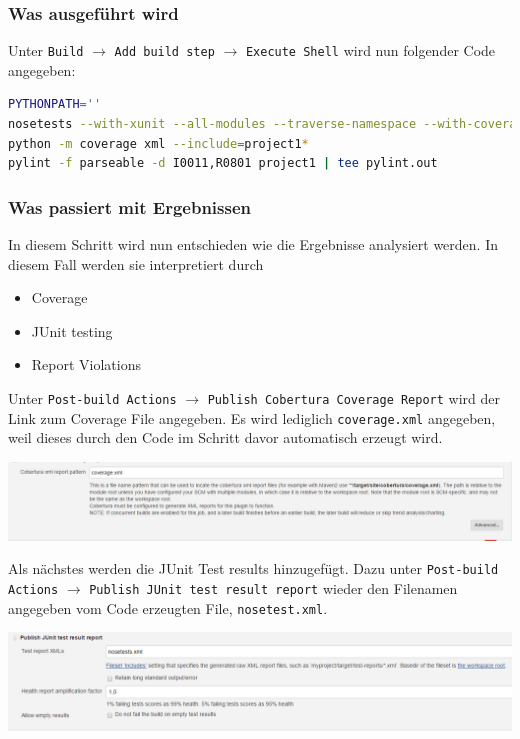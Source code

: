 \subsubsection{Was ausgeführt wird}
Unter \verb|Build| $\rightarrow$ \verb|Add build step| $\rightarrow$ \verb|Execute Shell| wird nun folgender Code angegeben:

\begin{lstlisting}[language=bash]
PYTHONPATH=''
nosetests --with-xunit --all-modules --traverse-namespace --with-coverage --cover-package=project1 --cover-inclusive
python -m coverage xml --include=project1*
pylint -f parseable -d I0011,R0801 project1 | tee pylint.out
\end{lstlisting}

\subsubsection{Was passiert mit Ergebnissen}
In diesem Schritt wird nun entschieden wie die Ergebnisse analysiert werden. In diesem Fall werden sie interpretiert durch
\begin{itemize}
	\item Coverage
	\item JUnit testing
	\item Report Violations
\end{itemize}

Unter \verb|Post-build Actions| $\rightarrow$ \verb|Publish Cobertura Coverage Report| wird der Link zum Coverage File angegeben. Es wird lediglich \verb|coverage.xml| angegeben, weil dieses durch den Code im Schritt davor automatisch erzeugt wird.

\begin{minipage}{\linewidth}
	\centering
	\includegraphics[width=0.8\linewidth]{images/coverage_report}
\end{minipage}

Als nächstes werden die JUnit Test results hinzugefügt. Dazu unter \verb|Post-build Actions| $\rightarrow$ \verb|Publish JUnit test result report| wieder den Filenamen angegeben vom Code erzeugten File, \verb|nosetest.xml|.

\begin{minipage}{\linewidth}
	\centering
	\includegraphics[width=0.8\linewidth]{images/junit_tests}
\end{minipage}

